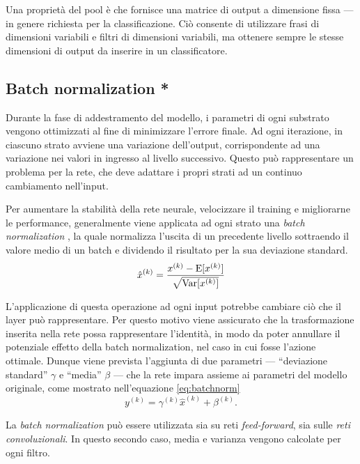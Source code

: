 Una proprietà del pool è che fornisce una matrice di output a dimensione fissa --- in genere richiesta per la classificazione. Ciò consente di utilizzare frasi di dimensioni variabili e filtri di dimensioni variabili, ma ottenere sempre le stesse dimensioni di output da inserire in un classificatore.

\subsection{Batch normalization *}
\label{subsec:normalization}

Durante la fase di addestramento del modello, i parametri di ogni substrato vengono ottimizzati al fine di minimizzare l'errore finale.
Ad ogni iterazione, in ciascuno strato avviene una variazione dell'output, corrispondente ad una variazione nei valori in ingresso al livello successivo.
Questo può rappresentare un problema per la rete, che deve adattare i propri strati ad un continuo cambiamento nell'input. 

Per aumentare la stabilità della rete neurale, velocizzare il training e migliorarne le performance, generalmente viene applicata ad ogni strato una \emph{batch normalization}  \cite{ioffe2015batch}, la quale normalizza l'uscita di un precedente livello sottraendo il valore medio di un batch e dividendo il risultato per la sua deviazione standard.
\begin{equation}
	\hat{x}^{(k)}=\frac{x^{(k)}-\operatorname{E}[x^{(k)}]}{\sqrt{\operatorname{Var}[x^{(k)}]}}
\end{equation}

L'applicazione di questa operazione ad ogni input potrebbe cambiare ciò che il layer può rappresentare. Per questo motivo viene assicurato che la trasformazione inserita nella rete possa rappresentare l'identità, in modo da poter annullare il potenziale effetto della batch normalization, nel caso in cui fosse l'azione ottimale.
Dunque viene prevista l'aggiunta di due parametri --- ``deviazione standard'' $\gamma$ e ``media'' $\beta$ --- che la rete impara assieme ai parametri del modello originale, come mostrato nell'equazione \ref{eq:batchnorm}
\begin{equation}
	y^{(k)}=\gamma^{(k)}\hat{x}^{(k)}+\beta^{(k)}\mbox{.}
	\label{eq:batchnorm}
\end{equation}

La \emph{batch normalization} può essere utilizzata sia su reti \emph{feed-forward}, sia sulle \emph{reti convoluzionali}.
In questo secondo caso, media e varianza vengono calcolate per ogni filtro.

